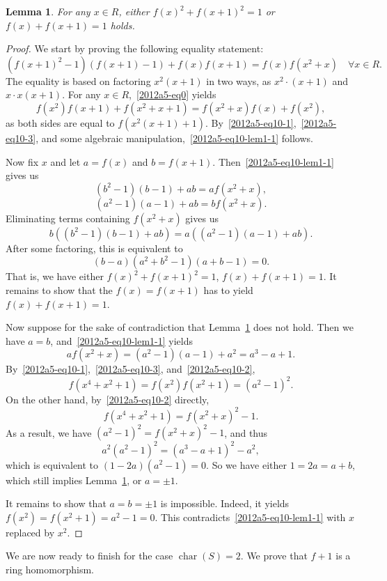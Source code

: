 \documentclass{article}
\DeclareMathOperator{\rchar}{char}
\newtheorem{lemma}{Lemma}
\begin{document}
\begin{lemma}\label{2012a5-10-1}
For any $x \in R$, either $f(x)^2 + f(x + 1)^2 = 1$ or $f(x) + f(x + 1) = 1$ holds.
\end{lemma}
\begin{proof}
We start by proving the following equality statement:
\[ (f(x + 1)^2 - 1)(f(x + 1) - 1) + f(x) f(x + 1) = f(x) f(x^2 + x) \quad \forall x \in R. \tag{10.L1.1}\label{2012a5-eq10-lem1-1} \]
The equality is based on factoring $x^2 (x + 1)$ in two ways, as $x^2 \cdot (x + 1)$ and $x \cdot x(x + 1)$.
For any $x \in R$,~\eqref{2012a5-eq0} yields
\[ f(x^2) f(x + 1) + f(x^2 + x + 1) = f(x^2 + x) f(x) + f(x^2), \]
    as both sides are equal to $f(x^2 (x + 1) + 1)$.
By~\eqref{2012a5-eq10-1},~\eqref{2012a5-eq10-3}, and some algebraic manipulation,~\eqref{2012a5-eq10-lem1-1} follows.

Now fix $x$ and let $a = f(x)$ and $b = f(x + 1)$.
Then~\eqref{2012a5-eq10-lem1-1} gives us
\[ (b^2 - 1)(b - 1) + ab = a f(x^2 + x), \]
\[ (a^2 - 1)(a - 1) + ab = b f(x^2 + x). \]
Eliminating terms containing $f(x^2 + x)$ gives us
\[ b((b^2 - 1)(b - 1) + ab) = a((a^2 - 1)(a - 1) + ab). \]
After some factoring, this is equivalent to
\[ (b - a)(a^2 + b^2 - 1)(a + b - 1) = 0. \]
That is, we have either $f(x)^2 + f(x + 1)^2 = 1$, $f(x) + f(x + 1) = 1$.
It remains to show that the $f(x) = f(x + 1)$ has to yield $f(x) + f(x + 1) = 1$.

Now suppose for the sake of contradiction that Lemma~\ref{2012a5-10-1} does not hold.
Then we have $a = b$, and~\eqref{2012a5-eq10-lem1-1} yields
\[ a f(x^2 + x) = (a^2 - 1)(a - 1) + a^2 = a^3 - a + 1. \]
By~\eqref{2012a5-eq10-1},~\eqref{2012a5-eq10-3}, and~\eqref{2012a5-eq10-2},
\[ f(x^4 + x^2 + 1) = f(x^2) f(x^2 + 1) = (a^2 - 1)^2. \]
On the other hand, by~\eqref{2012a5-eq10-2} directly,
\[ f(x^4 + x^2 + 1) = f(x^2 + x)^2 - 1. \]
As a result, we have $(a^2 - 1)^2 = f(x^2 + x)^2 - 1$, and thus
\[ a^2 (a^2 - 1)^2 = (a^3 - a + 1)^2 - a^2, \]
    which is equivalent to $(1 - 2a)(a^2 - 1) = 0$.
So we have either $1 = 2a = a + b$, which still implies Lemma~\ref{2012a5-10-1}, or $a = \pm 1$.

It remains to show that $a = b = \pm 1$ is impossible.
Indeed, it yields $f(x^2) = f(x^2 + 1) = a^2 - 1 = 0$.
This contradicts~\eqref{2012a5-eq10-lem1-1} with $x$ replaced by $x^2$.
\end{proof}

We are now ready to finish for the case $\rchar(S) = 2$.
We prove that $f + 1$ is a ring homomorphism.
\end{document}
